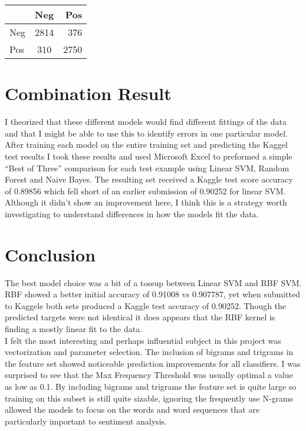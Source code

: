 \documentclass[11pt]{article}
\begin{document}
\begin{center}
	 \label{cm_rf}
	\begin{tabular}{ l | c | r } \hline
		& 	Neg  	& Pos\\ \hline
	Neg &	2814	& 376 \\
	Pos &	310		& 2750
	\end{tabular}
\end{center}

\section{Combination Result} \label{combo}
I theorized that these different models would find different fittings of the data and that I might be able to use this to identify errors in one particular model. After training each model on the entire training set and predicting the Kaggel test results I took these results and used Microsoft Excel to preformed a simple ``Best of Three'' comparison for each test example using Linear SVM, Random Forest and Naive Bayes. The resulting set received a Kaggle test score accuracy of 0.89856 which fell short of an earlier submission of 0.90252 for linear SVM. Although it didn't show an improvement here, I think this is a strategy worth investigating to understand differences in how the models fit the data.\\

\section{Conclusion}
The best model choice was a bit of a tossup between Linear SVM and RBF SVM. RBF showed a better initial accuracy of 0.91008 vs 0.907787, yet when submitted to Kaggele both sets produced a Kaggle test accuracy of 0.90252. Though the predicted targets were not identical it does appears that the RBF kernel is finding a mostly linear fit to the data.\\

I felt the most interesting and perhaps influential subject in this project was vectorization and parameter selection. The inclusion of bigrams and trigrams in the feature set showed noticeable prediction improvements for all classifiers. I was surprised to see that the Max Frequency Threshold was usually optimal a value as low as 0.1. By including bigrams and trigrams the feature set is quite large so training on this subset is still quite sizable, ignoring the frequently use N-grams allowed the models to focus on the words and word sequences that are particularly important to sentiment analysis.\\
\end{document}
